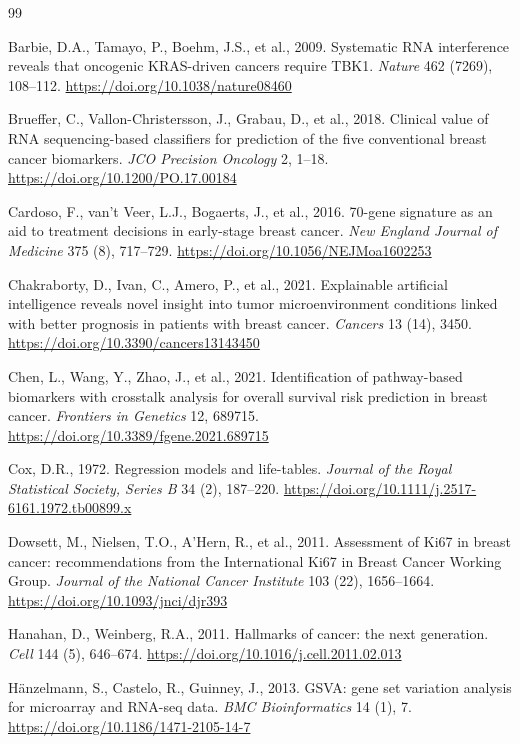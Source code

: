 \documentclass[review,12pt]{elsarticle}
\begin{document}
\begin{thebibliography}{99}

Barbie, D.A., Tamayo, P., Boehm, J.S., et al., 2009.
Systematic RNA interference reveals that oncogenic KRAS-driven cancers
require TBK1. \emph{Nature} 462 (7269), 108--112.
\url{https://doi.org/10.1038/nature08460}

Brueffer, C., Vallon-Christersson, J., Grabau, D., et al., 2018.
Clinical value of RNA sequencing-based classifiers for prediction of the
five conventional breast cancer biomarkers. \emph{JCO Precision Oncology}
2, 1--18.
\url{https://doi.org/10.1200/PO.17.00184}

Cardoso, F., van't Veer, L.J., Bogaerts, J., et al., 2016.
70-gene signature as an aid to treatment decisions in early-stage breast
cancer. \emph{New England Journal of Medicine} 375 (8), 717--729.
\url{https://doi.org/10.1056/NEJMoa1602253}

Chakraborty, D., Ivan, C., Amero, P., et al., 2021.
Explainable artificial intelligence reveals novel insight into tumor
microenvironment conditions linked with better prognosis in patients with
breast cancer. \emph{Cancers} 13 (14), 3450.
\url{https://doi.org/10.3390/cancers13143450}

Chen, L., Wang, Y., Zhao, J., et al., 2021.
Identification of pathway-based biomarkers with crosstalk analysis for
overall survival risk prediction in breast cancer.
\emph{Frontiers in Genetics} 12, 689715.
\url{https://doi.org/10.3389/fgene.2021.689715}

Cox, D.R., 1972.
Regression models and life-tables.
\emph{Journal of the Royal Statistical Society, Series B} 34 (2),
187--220.
\url{https://doi.org/10.1111/j.2517-6161.1972.tb00899.x}

Dowsett, M., Nielsen, T.O., A'Hern, R., et al., 2011.
Assessment of Ki67 in breast cancer: recommendations from the
International Ki67 in Breast Cancer Working Group.
\emph{Journal of the National Cancer Institute} 103 (22), 1656--1664.
\url{https://doi.org/10.1093/jnci/djr393}

Hanahan, D., Weinberg, R.A., 2011.
Hallmarks of cancer: the next generation.
\emph{Cell} 144 (5), 646--674.
\url{https://doi.org/10.1016/j.cell.2011.02.013}

H{\"a}nzelmann, S., Castelo, R., Guinney, J., 2013.
GSVA: gene set variation analysis for microarray and RNA-seq data.
\emph{BMC Bioinformatics} 14 (1), 7.
\url{https://doi.org/10.1186/1471-2105-14-7}


\end{thebibliography}
\end{document}
